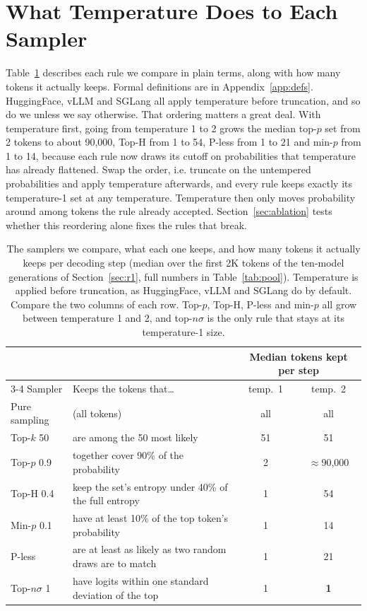 \documentclass{article}
\begin{document}
\section{What Temperature Does to Each Sampler}
\label{sec:method}

Table~\ref{tab:glance} describes each rule we compare in plain terms, along with how many tokens it actually keeps. Formal definitions are in Appendix~\ref{app:defs}. HuggingFace, vLLM and SGLang all apply temperature before truncation, and so do we unless we say otherwise. That ordering matters a great deal. With temperature first, going from temperature 1 to 2 grows the median top-$p$ set from 2 tokens to about 90,000, Top-H from 1 to 54, P-less from 1 to 21 and min-$p$ from 1 to 14, because each rule now draws its cutoff on probabilities that temperature has already flattened. Swap the order, i.e. truncate on the untempered probabilities and apply temperature afterwards, and every rule keeps exactly its temperature-1 set at any temperature. Temperature then only moves probability around among tokens the rule already accepted. Section~\ref{sec:ablation} tests whether this reordering alone fixes the rules that break.

\begin{table}[t]
\centering
\caption{The samplers we compare, what each one keeps, and how many tokens it actually keeps per decoding step (median over the first 2K tokens of the ten-model generations of Section~\ref{sec:r1}, full numbers in Table~\ref{tab:pool}). Temperature is applied before truncation, as HuggingFace, vLLM and SGLang do by default. Compare the two columns of each row. Top-$p$, Top-H, P-less and min-$p$ all grow between temperature 1 and 2, and top-$n\sigma$ is the only rule that stays at its temperature-1 size.}
\label{tab:glance}
\small
\setlength{\tabcolsep}{4pt}
\begin{tabular}{l>{\raggedright\arraybackslash}p{6.4cm}cc}
\toprule
 & & \multicolumn{2}{c}{Median tokens kept per step} \\
\cmidrule(lr){3-4}
Sampler & Keeps the tokens that\ldots & temp.\ 1 & temp.\ 2 \\
\midrule
Pure sampling & (all tokens) & all & all \\
Top-$k$ 50 & are among the 50 most likely & 51 & 51 \\
Top-$p$ 0.9 & together cover 90\% of the probability & 2 & $\approx$90{,}000 \\
Top-H 0.4 & keep the set's entropy under 40\% of the full entropy & 1 & 54 \\
Min-$p$ 0.1 & have at least 10\% of the top token's probability & 1 & 14 \\
P-less & are at least as likely as two random draws are to match & 1 & 21 \\
Top-$n\sigma$ 1 & have logits within one standard deviation of the top & 1 & \textbf{1} \\
\bottomrule
\end{tabular}
\end{table}
\end{document}
